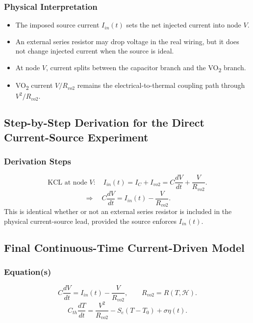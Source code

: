 \documentclass[11pt]{article}
\begin{document}
\subsubsection*{Physical Interpretation}
\begin{itemize}
    \item The imposed source current \(I_{in}(t)\) sets the net injected current into node \(V\).
    \item An external series resistor may drop voltage in the real wiring, but it does not change injected current when the source is ideal.
    \item At node \(V\), current splits between the capacitor branch and the VO\textsubscript{2} branch.
    \item VO\textsubscript{2} current \(V/R_{vo2}\) remains the electrical-to-thermal coupling path through \(V^2/R_{vo2}\).
\end{itemize}

\subsection{Step-by-Step Derivation for the Direct Current-Source Experiment}
\subsubsection*{Derivation Steps}
\begin{equation}
\text{KCL at node }V:\quad
I_{in}(t)=I_C+I_{vo2}
=C\frac{dV}{dt}+\frac{V}{R_{vo2}}.
\label{eq:sec2_kcl_current_source}
\end{equation}
\begin{equation}
\Rightarrow\quad
C\frac{dV}{dt}=I_{in}(t)-\frac{V}{R_{vo2}}.
\label{eq:sec2_direct_current_ode}
\end{equation}
This is identical whether or not an external series resistor is included in the physical current-source lead, provided the source enforces \(I_{in}(t)\).

\subsection{Final Continuous-Time Current-Driven Model}
\subsubsection*{Equation(s)}
\begin{equation}
C\frac{dV}{dt}=I_{in}(t)-\frac{V}{R_{vo2}},
\qquad
R_{vo2}=R(T,\mathcal{H}).
\label{eq:sec2_final_electrical}
\end{equation}
\begin{equation}
C_{th}\frac{dT}{dt}=\frac{V^2}{R_{vo2}}-S_e(T-T_0)+\sigma\eta(t).
\label{eq:sec2_final_thermal}
\end{equation}
\end{document}
